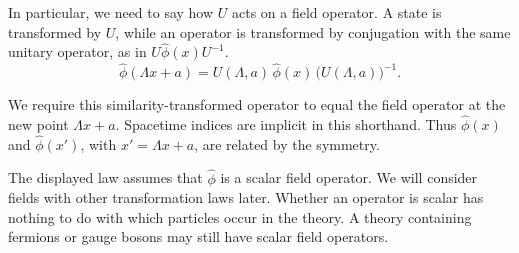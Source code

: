 In particular, we need to say how $U$ acts on a field operator.
A state is transformed by $U$, while an operator is transformed by conjugation
with the same unitary
operator, as in $U\hat\phi(x)U^{-1}$.
\begin{equation}
  \hat\phi(\Lambda x+a)
  =U(\Lambda,a)\,\hat\phi(x)\,\bigl(U(\Lambda,a)\bigr)^{-1}.
  \label{eq:253a-scalar-covariance}
\end{equation}

We require this similarity-transformed operator to equal the field operator at
the new point $\Lambda x+a$. Spacetime indices are implicit in this shorthand.
Thus $\hat\phi(x)$ and $\hat\phi(x')$, with $x'=\Lambda x+a$, are related by the
symmetry.

The displayed law assumes that $\hat\phi$ is a scalar field operator. We will
consider fields with other transformation laws later.
Whether an operator is scalar has nothing to do with which particles occur in
the theory. A theory containing fermions or gauge bosons may still have scalar
field operators.

